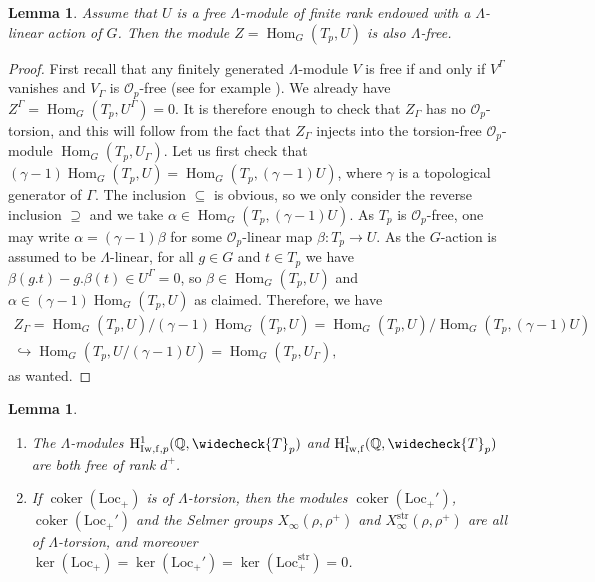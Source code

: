 \documentclass[12pt]{amsart}
\newcommand\bQ{\mathbb{Q}}
\newcommand\cO{\mathcal{O}}
\newcommand{\Loc}{\mathrm{Loc}}
\newcommand{\str}{\mathrm{str}}
\DeclareMathOperator{\Hom}{Hom}
\DeclareMathOperator{\coker}{coker}
\newcommand{\HH}{\mathrm{H}}
\newcommand{\ff}{\mathrm{f}}
\newcommand{\Iw}{\mathrm{Iw}}
\theoremstyle{defstyle}
\theoremstyle{thmstyle}
\newtheorem{lemme}[subsubsection]{Lemma}
\begin{document}
\begin{lemme}\label{lem:liberté_module_G_équiv}
	Assume that $U$ is a free $\Lambda$-module of finite rank endowed with a $\Lambda$-linear action of $G$. Then the module $Z=\Hom_G(T_p,U)$ is also $\Lambda$-free.
\end{lemme}
\begin{proof}
	First recall that any finitely generated $\Lambda$-module $V$ is free if and only if $V^\Gamma$ vanishes and $V_\Gamma$ is $\cO_p$-free (see for example \cite[Lemme 1.1]{belliard}). We already have $Z^\Gamma=\Hom_G(T_p,U^\Gamma)=0$. It is therefore enough to check that $Z_\Gamma$ has no $\cO_p$-torsion, and this will follow from the fact that $Z_\Gamma$ injects into the torsion-free $\cO_p$-module $\Hom_G(T_p,U_\Gamma)$. Let us first check that $(\gamma-1)\Hom_G(T_p,U)=\Hom_G(T_p,(\gamma-1)U)$, where $\gamma$ is a topological generator of $\Gamma$. The inclusion $\subseteq$ is obvious, so we only consider the reverse inclusion $\supseteq$ and we take $\alpha \in \Hom_G(T_p,(\gamma-1)U)$. As $T_p$ is $\cO_p$-free, one may write $\alpha=(\gamma-1)\beta$ for some $\cO_p$-linear map $\beta : T_p \longrightarrow U$. As the $G$-action is assumed to be $\Lambda$-linear, for all $g\in G$ and $t\in T_p$ we have $\beta(g.t)-g.\beta(t) \in U^\Gamma=0$, so $\beta \in \Hom_G(T_p,U)$ and $\alpha \in (\gamma-1)\Hom_G(T_p,U)$ as claimed. Therefore, we have 
	\begin{multline*}
	Z_\Gamma = \Hom_G(T_p,U)/(\gamma-1)\Hom_G(T_p,U)= \Hom_G(T_p,U)/\Hom_G(T_p,(\gamma-1)U) \\ \hookrightarrow \Hom_G(T_p,U/(\gamma-1)U)=\Hom_G(T_p,U_\Gamma),
	\end{multline*}
	as wanted.
	\end{proof}

\begin{lemme}\label{lem:freeness_Iwasawa_modules}\hspace{2em}
	\begin{enumerate}
		\item The $\Lambda$-modules $\HH^1_{\Iw,\ff,p}(\bQ,\widecheck{T}_p)$ and $\HH^1_{\Iw,\ff}(\bQ,\widecheck{T}_p)$ are both free of rank $d^+$.
		\item If $\coker \left(\Loc_+\right)$ is of $\Lambda$-torsion, then the modules $\coker\left(\Loc_+'\right)$, $\coker\left(\Loc_+'\right)$ and the Selmer groups $X_\infty(\rho,\rho^+)$ and $X^\str_\infty(\rho,\rho^+)$ are all of $\Lambda$-torsion, and moreover $\ker \left(\Loc_+\right)=\ker \left(\Loc_+'\right)=\ker \left(\Loc_+^\str\right)=0$.
	\end{enumerate}
\end{lemme}
\end{document}
